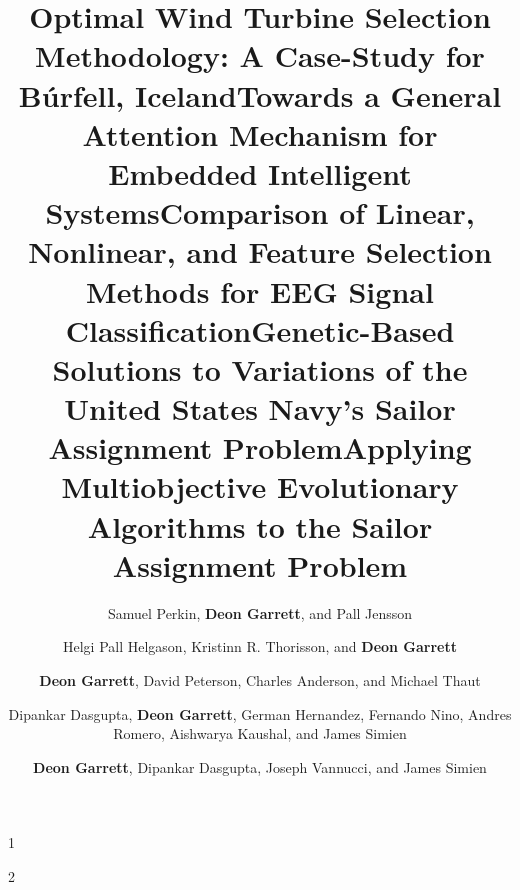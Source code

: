 \documentclass[a4paper,10pt]{cvclean}
\begin{document}
\begin{publications}
  \begin{journalarticles}
    \begin{paper}
      \title{Optimal Wind Turbine Selection Methodology: A Case-Study for
        Búrfell, Iceland}
      \author{Samuel Perkin, \textbf{Deon Garrett}, and Pall Jensson}
    \end{paper}
    \begin{paper}
      \title{Towards a General Attention Mechanism for Embedded Intelligent
        Systems}
      \author{Helgi Pall Helgason, Kristinn R. Thorisson, and \textbf{Deon
          Garrett}}
      \num{1}
    \end{paper}
    \begin{paper}
      \title{Comparison of Linear, Nonlinear, and Feature Selection Methods for
        EEG Signal Classification}
      \author{\textbf{Deon Garrett}, David Peterson, Charles Anderson, and Michael Thaut}
      \num{2}
    \end{paper}
  \end{journalarticles}

  \begin{bookchapters}
    \begin{paper}
      \title{Genetic-Based Solutions to Variations of the United States Navy's
        Sailor Assignment Problem}
      \author{Dipankar Dasgupta, \textbf{Deon Garrett}, German Hernandez, Fernando Nino,
        Andres Romero, Aishwarya Kaushal, and James Simien}
    \end{paper}
    \begin{paper}
      \title{Applying Multiobjective Evolutionary Algorithms to the Sailor
        Assignment Problem}
      \author{\textbf{Deon Garrett}, Dipankar Dasgupta, Joseph Vannucci, and James
        Simien}
    \end{paper}
  \end{bookchapters}


\end{publications}
\end{document}
